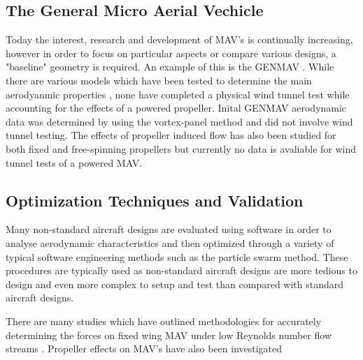 {\subsection{The General Micro Aerial Vechicle}
\label{subsec:GenMAV}
Today the interest, research and development of MAV's is continually increasing, however in order to focus on particular aspects or compare various designs, a "baseline" geometry is required. An example of this is the GENMAV \cite{Stewart2007}. While there are various models which have been tested to determine the main aerodyanmic properties \cite{Stewart2007}, none have completed a physical wind tunnel test while accounting for the effects of a powered propeller. Inital GENMAV aerodynamic data was determined by using the vortex-panel method \cite{Stewart2007} and did not involve wind tunnel testing. The effects of propeller induced flow has also been studied for both fixed and free-spinning propellers but currently no data is avaliable for wind tunnel tests of a powered MAV.

\subsection{Optimization Techniques and Validation}
\label{subsec:Optimization}
Many non-standard aircraft designs are evaluated using software in order to analyse aerodynamic characteristics and then optimized through a variety of typical software engineering methods such as the particle swarm method. These procedures are typically used as non-standard aircraft designs are more tedious to design and even more complex to setup and test than compared with standard aircraft designs. 

There are many studies which have outlined methodologies for accurately determining the forces on fixed wing MAV under low Reynolds number flow streams \cite{Ananda2015} \cite{Roberts2011} \cite{Suhariyono2006} \cite{Zhan2012}. Propeller effects on MAV's have also been investigated


}
